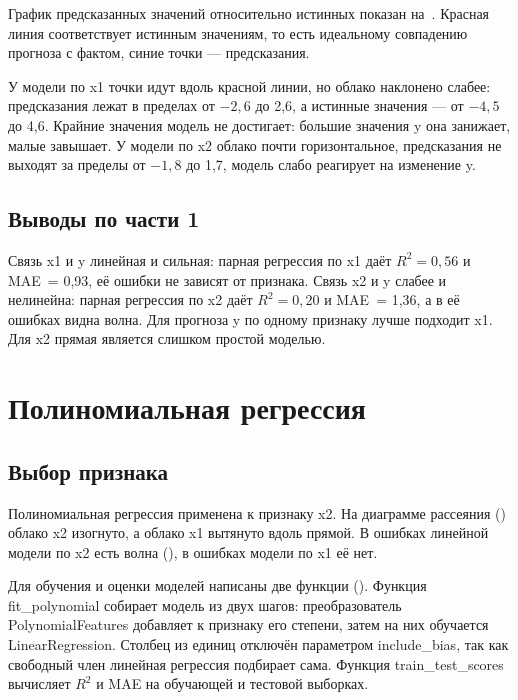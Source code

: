 \documentclass[a4paper,14pt]{extarticle}
\begin{document}
График предсказанных значений относительно истинных показан на~. Красная линия соответствует истинным значениям, то есть идеальному совпадению прогноза с фактом, синие точки — предсказания.


У модели по x1 точки идут вдоль красной линии, но облако наклонено слабее: предсказания лежат в пределах от $-2{,}6$ до 2,6, а истинные значения — от $-4{,}5$ до 4,6. Крайние значения модель не достигает: большие значения y она занижает, малые завышает. У модели по x2 облако почти горизонтальное, предсказания не выходят за пределы от $-1{,}8$ до 1,7, модель слабо реагирует на изменение y.

\subsection{Выводы по части 1}

Связь x1 и y линейная и сильная: парная регрессия по x1 даёт $R^2 = 0{,}56$ и MAE~= 0,93, её ошибки не зависят от признака. Связь x2 и y слабее и нелинейна: парная регрессия по x2 даёт $R^2 = 0{,}20$ и MAE~= 1,36, а в её ошибках видна волна. Для прогноза y по одному признаку лучше подходит x1. Для x2 прямая является слишком простой моделью.

\section{Полиномиальная регрессия}

\subsection{Выбор признака}

Полиномиальная регрессия применена к признаку x2. На диаграмме рассеяния () облако x2 изогнуто, а облако x1 вытянуто вдоль прямой. В ошибках линейной модели по x2 есть волна (), в ошибках модели по x1 её нет.

Для обучения и оценки моделей написаны две функции (). Функция fit\_polynomial собирает модель из двух шагов: преобразователь PolynomialFeatures добавляет к признаку его степени, затем на них обучается LinearRegression. Столбец из единиц отключён параметром include\_bias, так как свободный член линейная регрессия подбирает сама. Функция train\_test\_scores вычисляет $R^2$ и MAE на обучающей и тестовой выборках.
\end{document}
